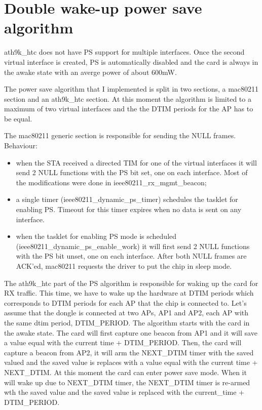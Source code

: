 
\clearpage
\section{Double wake-up power save algorithm}
\label{sec:twowakeup}

ath9k_htc does not have PS support for multiple interfaces. Once the second virtual interface is created, PS is automatically disabled and the card is always in the awake state with an averge power of about 600mW.


The power save algorithm that I implemented is split in two sections, a mac80211 section and an ath9k_htc section. At this moment the algorithm is limited to a maximum of two virtual interfaces and the the DTIM periods for the AP has to be equal.

The mac80211 generic section is responsible for sending the NULL frames. Behaviour:
\begin{itemize}
\item when the STA received a directed TIM for one of the virtual interfaces it will send 2 NULL functions with the PS bit set, one on each interface. Most of the modifications were done in ieee80211_rx_mgmt_beacon;
\item a single timer (ieee80211_dynamic_ps_timer) schedules the tasklet for enabling PS. Timeout for this timer expires when no data is sent on any interface.
\item when the tasklet for enabling PS mode is scheduled (ieee80211_dynamic_ps_enable_work) it will first send 2 NULL functions with the PS bit unset, one on each interface. After both NULL frames are ACK'ed, mac80211 requests the driver to put the chip in sleep mode. 
\end{itemize}

The ath9k_htc part of the PS algorithm is responsible for waking up the card for RX traffic. This time, we have to wake up the hardware at DTIM periods which corresponds to DTIM periods for each AP that the chip is connected to. Let's assume that the dongle is connected at two APs, AP1 and AP2, each AP with the same dtim period, DTIM_PERIOD. The algorithm starts with the card in the awake state. The card will first capture one beacon from AP1 and it will save a value equal with the current time + DTIM_PERIOD. Then, the card will capture a beacon from AP2, it will arm the NEXT_DTIM timer with the saved valued and the saved value is replaces with a value equal with the current time + NEXT_DTIM. At this moment the card can enter power save mode. When it will wake up due to NEXT_DTIM timer, the NEXT_DTIM timer is re-armed wth the saved value and the saved value is replaced with the current_time + DTIM_PERIOD.

